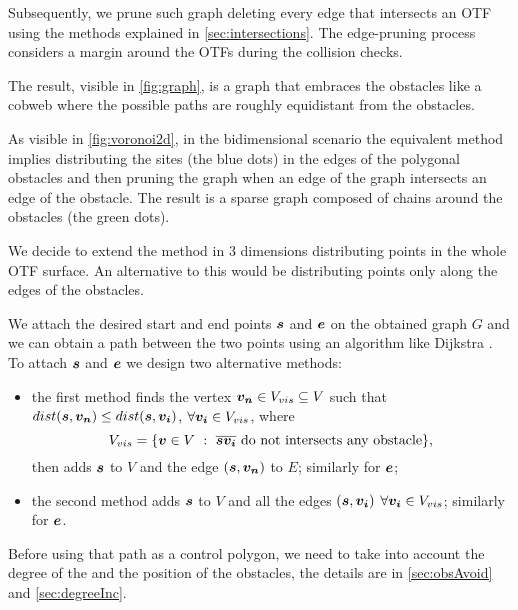 \documentclass[dissertation.tex]{subfiles}
\begin{document}
Subsequently, we prune such graph deleting every edge that
intersects an \ac{OTF} using the methods explained in
\cref{sec:intersections}. The edge-pruning process considers a margin
around the \acp{OTF} during the collision checks.

The result, visible in \cref{fig:graph}, is a graph that embraces the
obstacles like a cobweb where the possible paths are roughly
equidistant from the obstacles.

As visible
in \cref{fig:voronoi2d},
in the bidimensional scenario the equivalent method implies distributing
the sites (the blue dots) in the edges of the polygonal obstacles and
then pruning the 
graph when an edge of the graph intersects an edge of the
obstacle. The result is a sparse graph composed of chains around the
obstacles (the green dots).

We decide to extend the method in 3 dimensions distributing points in
the whole \ac{OTF} surface. An alternative to this would be distributing
points only along the edges of the obstacles.

We attach the desired start and end
points $\boldsymbol{s}$ and $\boldsymbol{e}$ on the obtained graph $G$ and we can obtain a path between the two points using an
algorithm like Dijkstra \cite{dijkstra}\cite{knuth}. To attach $\boldsymbol{s}$
and $\boldsymbol{e}$ we design two
alternative methods:
\begin{itemize}
\item the first method finds the vertex $\boldsymbol{v_n}\in V_{vis}\subseteq V$ such
  that $dist(\boldsymbol{s},\boldsymbol{v_n})\leq dist(\boldsymbol{s},\boldsymbol{v_i})$, $\forall
  \boldsymbol{v_i}\in V_{vis}$, where
  \begin{equation*}
    V_{vis}=\{\boldsymbol{v}\in V\ :\ \overline{\boldsymbol{s} \boldsymbol{v_i}}\ \text{do not
      intersects any obstacle}\},
  \end{equation*}
  then adds $\boldsymbol{s}$ to $V$ and the edge $(\boldsymbol{s},\boldsymbol{v_n})$ to $E$;
  similarly for $\boldsymbol{e}$;
\item the second method adds $\boldsymbol{s}$ to $V$ and all the edges $(\boldsymbol{s},\boldsymbol{v_i})$
  $\forall \boldsymbol{v_i}\in V_{vis}$; similarly for $\boldsymbol{e}$.
\end{itemize}

Before using that path as a control polygon,
we need to take into account the degree of the \bs and the
position of the obstacles, the details are in \cref{sec:obsAvoid} and
\cref{sec:degreeInc}.
\end{document}
